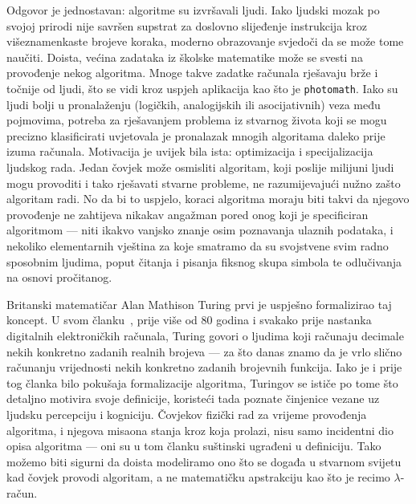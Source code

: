 Odgovor je jednostavan: algoritme su izvršavali ljudi. Iako ljudski mozak po svojoj prirodi nije savršen supstrat za doslovno slijeđenje instrukcija kroz višeznamenkaste brojeve koraka, moderno obrazovanje svjedoči da se može tome na\-u\-či\-ti. Doista, većina zadataka iz školske matematike može se svesti na provođenje nekog algoritma. Mnoge takve zadatke računala rješavaju brže i točnije od ljudi, što se vidi kroz uspjeh aplikacija kao što je \texttt{photomath}. Iako su ljudi bolji u pronalaženju (logičkih, analogijskih ili asocijativnih) veza među pojmovima, potreba za rješavanjem problema iz stvarnog života koji se mogu precizno klasificirati uvjetovala je pronalazak mnogih algoritama daleko prije izuma računala. Motivacija je uvijek bila ista: optimizacija i specijalizacija ljudskog rada. Jedan čovjek može osmisliti algoritam, koji poslije milijuni ljudi mogu provoditi i tako rješavati stvarne probleme, ne razumijevajući nužno zašto algoritam radi. No da bi to uspjelo, koraci algoritma moraju biti takvi da njegovo provođenje ne zahtijeva nikakav angažman pored onog koji je specificiran algoritmom --- niti ikakvo vanjsko znanje osim poznavanja ulaznih podataka, i nekoliko elementarnih vještina za koje smatramo da su svojstvene svim radno sposobnim ljudima, poput čitanja i pisanja fiksnog skupa simbola te odlučivanja na osnovi pročitanog.

Britanski matematičar Alan Mathison Turing prvi je uspješno formalizirao taj koncept. U svom članku~\cite{turing}, prije više od 80 godina i svakako prije nastanka digitalnih elektroničkih računala, Turing govori o ljudima koji računaju decimale nekih konkretno zadanih realnih brojeva --- za što danas znamo da je vrlo slično računanju vrijednosti nekih konkretno zadanih brojevnih funkcija. Iako je i prije tog članka bilo pokušaja formalizacije algoritma, Turingov se ističe po tome što detaljno motivira svoje definicije, koristeći tada poznate činjenice vezane uz ljudsku percepciju i kogniciju. Čovjekov fizički rad za vrijeme provođenja algoritma, i njegova misaona stanja kroz koja prolazi, nisu samo incidentni dio opisa algoritma --- oni su u tom članku suštinski ugrađeni u definiciju. Tako možemo biti sigurni da doista modeliramo ono što se događa u stvarnom svijetu kad čovjek provodi algoritam, a ne matematičku apstrakciju kao što je recimo $\lambda$-račun.


